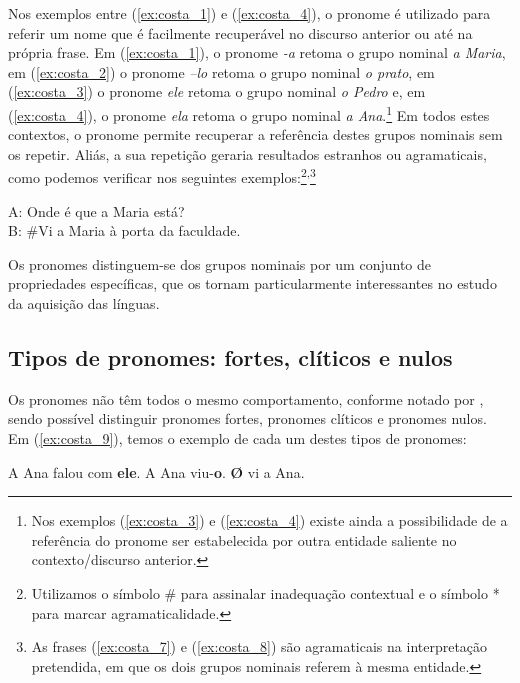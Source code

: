 \documentclass[output=paper]{LSP/langsci}
\begin{document}
Nos exemplos entre (\ref{ex:costa_1}) e (\ref{ex:costa_4}), o pronome é utilizado para referir um nome que é facilmente recuperável no discurso anterior ou até na própria frase. Em (\ref{ex:costa_1}), o pronome \textit{-a} retoma o grupo nominal \textit{a Maria}, em (\ref{ex:costa_2}) o pronome \textit{–lo} retoma o grupo nominal \textit{o prato}, em (\ref{ex:costa_3}) o pronome \textit{ele} retoma o grupo nominal \textit{o Pedro} e, em (\ref{ex:costa_4}), o pronome \textit{ela} retoma o grupo nominal \textit{a Ana}.\footnote{Nos exemplos (\ref{ex:costa_3}) e (\ref{ex:costa_4}) existe ainda a possibilidade de a referência do pronome ser estabelecida por outra entidade saliente no contexto/discurso anterior.} Em todos estes contextos, o pronome permite recuperar a referência destes grupos nominais sem os repetir. Aliás, a sua repetição geraria resultados estranhos ou agramaticais, como podemos verificar nos seguintes exemplos:\footnote{Utilizamos o símbolo \# para assinalar inadequação contextual e o símbolo * para marcar agramaticalidade.}\textsuperscript{,}\footnote{As frases (\ref{ex:costa_7}) e (\ref{ex:costa_8}) são agramaticais na interpretação pretendida, em que os dois grupos nominais referem à mesma entidade.}

\ea\label{ex:costa_5}
A: Onde é que a Maria está?\\B: \#Vi a Maria à porta da faculdade.
\z

\z
{}
\z
{}
\z

Os pronomes distinguem-se dos grupos nominais por um conjunto de propriedades específicas, que os tornam particularmente interessantes no estudo da aquisição das línguas.

\subsection{Tipos de pronomes: fortes, clíticos e nulos}
\label{subsec:costa_tipos_pronomes}

Os pronomes não têm todos o mesmo comportamento, conforme notado por \citet{cardinalettistarke1994}, sendo possível distinguir pronomes fortes, pronomes clíticos e pronomes nulos. Em (\ref{ex:costa_9}), temos o exemplo de cada um destes tipos de pronomes:

\ea\label{ex:costa_9}
\ea\label{ex:costa_9a} A Ana falou com \textbf{ele}.
\ex\label{ex:costa_9b} A Ana viu-\textbf{o}.
\ex\label{ex:costa_9c} \textbf{Ø} vi a Ana.
\zl
\end{document}

